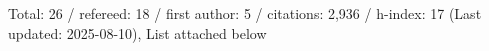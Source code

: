 Total: 26 / refereed: 18 / first author: 5 / citations: 2,936 / h-index: 17 (Last updated: 2025-08-10), List attached below